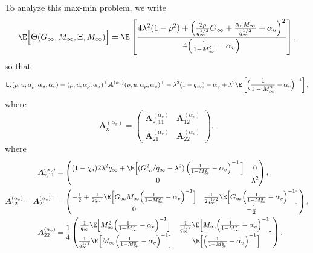 \documentclass[]{article}
\def\sx{{\mathsf x}}
\def\bA{{\boldsymbol A}}
\def\bA{{\boldsymbol A}}
\def\sL{\mathsf{L}}
\begin{document}
To analyze this max-min problem,
we write
\begin{equation}
    \E\Big[\Theta(G_\infty,M_\infty,\Xi,M_{\infty})\Big]
        = 
        \E\left[
            \frac{4\lambda^2(1-\rho^2) + \Big(\frac{2\rho}{ q_\infty^{1/2}} G_\infty+\frac{\alpha_\rho M_\infty}{q_\infty^{1/2}} + \alpha_u\Big)^2}{4\Big(\frac1{1-M_\infty^2} - \alpha_v\Big)}
        \right],
\end{equation}
so that
\begin{equation}
    \sL_{\sx}(\rho,u;\alpha_\rho,\alpha_u,\alpha_v)
        =
        (\rho,u,\alpha_\rho,\alpha_u)^\top
        \bA^{(\alpha_v)}
        (\rho,u,\alpha_\rho,\alpha_u)^\top
        -\lambda^2(1-q_\infty) 
        - \alpha_v 
        +\lambda^2\E\left[\Big(\frac1{1-M_\infty^2} - \alpha_v\Big)^{-1}\right],
\end{equation}
where 
\begin{equation}
    \bA_{\sx}^{(\alpha_v)}
        =
        \begin{pmatrix}
            \bA^{(\alpha_v)}_{\sx,11} & \bA^{(\alpha_v)}_{12} \\[5pt]
            \bA^{(\alpha_v)}_{21} & \bA^{(\alpha_v)}_{22} 
        \end{pmatrix},
\end{equation}
where 
\begin{equation}
\begin{aligned}
    \bA^{(\alpha_v)}_{\sx,11} 
        &=
        \begin{pmatrix}
            (1-\chi_{\sx})2\lambda^2 q_\infty 
            + 
            \E\Big[(G_\infty^2/q_\infty - \lambda^2)\left(\frac1{1-M_\infty^2} - \alpha_v\right)^{-1}\Big]
            & 0 \\[5pt]
            0 & \lambda^2 
        \end{pmatrix},
    \\
    \bA^{(\alpha_v)}_{12} 
        =
        \bA^{(\alpha_v)\top}_{21} 
        &= 
        \begin{pmatrix}
            -\frac{1}{2} + \frac1{2q_\infty} \E\Big[G_\infty M_\infty\Big(\frac1{1-M_\infty^2} - \alpha_v\Big)^{-1}\Big]
            & \frac{1}{2q_\infty^{1/2}} \E\Big[G_\infty \Big(\frac1{1-M_\infty^2} - \alpha_v\Big)^{-1}\Big]
            \\[5pt]
            0 & - \frac12 
        \end{pmatrix},
    \\
    \bA^{(\alpha_v)}_{22}
        &=
        \frac14
        \begin{pmatrix}
            \frac1{q_\infty}\E\Big[M_\infty^2\Big(\frac1{1-M_\infty^2} - \alpha_v\Big)^{-1}\Big]
            & 
            \frac1{q_\infty^{1/2}}\E\Big[M_\infty\Big(\frac1{1-M_\infty^2} - \alpha_v\Big)^{-1}\Big]
            \\[5pt]
            \frac1{q_\infty^{1/2}}\E\Big[M_\infty\Big(\frac1{1-M_\infty^2} - \alpha_v\Big)^{-1}\Big]
            & 
            \E\Big[\Big(\frac1{1-M_\infty^2} - \alpha_v\Big)^{-1}\Big]
        \end{pmatrix}.
\end{aligned}
\end{equation}
\end{document}
